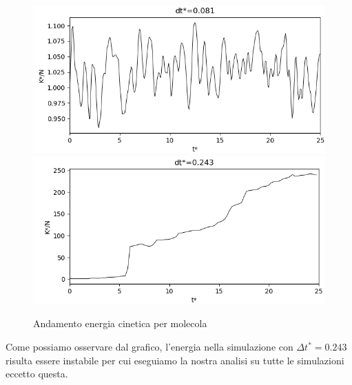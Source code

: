 \documentclass[a4paper,11pt]{article}
\begin{document}
\begin{figure}[H]
	\centering 
	{\includegraphics[width=0.65\linewidth]{runstabili/K0081}}\\
	{\includegraphics[width=0.65\linewidth]{runstabili/K0243}}\\
	\caption{Andamento energia cinetica per molecola}
\end{figure}
\noindent Come possiamo osservare dal grafico, l'energia nella simulazione con $\Delta t^* = 0.243$ risulta essere instabile per cui eseguiamo la nostra analisi su tutte le simulazioni eccetto questa.
\end{document}
